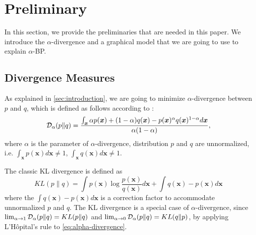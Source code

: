 \documentclass[conference]{IEEEtran}
\begin{document}





\section{Preliminary}\label{sec:preliminary}
In this section, we provide the preliminaries that are needed in this paper. We introduce the $\alpha$-divergence and a graphical model that we are going to use to explain $\alpha$-BP.

\subsection{Divergence Measures}
As explained in \autoref{sec:introduction}, we are going to minimize $\alpha$-divergence between $p$ and $q$, which is defined as follows according to \cite{Zhu95informationgeometric}\cite{divergence-measures-and-message-passing}: \\
\begin{equation}\label{eq:alpha-divergence}
  \mathcal{D}_{\alpha}(p \| q ) = \frac{\int_{\bm{x}} \alpha p(\bm{x}) + (1-\alpha) q (\bm{x}) - p(\bm{x})^{\alpha} q(\bm{x})^{1-\alpha} d\bm{x}}{\alpha(1-\alpha)},
\end{equation}
where $\alpha$ is the parameter of $\alpha$-divergence, distribution $p$ and $q$ are unnormalized, i.e. $\int_{\bm{x}}p(\bm{x}) d\bm{x} \neq 1$, $\int_{\bm{x}}q(\bm{x}) d\bm{x} \neq 1$.

The classic KL divergence is defined as
\begin{equation}
  KL(p \| q) = \int p(\bm{x}) \log{\frac{p(\bm{x})}{q(\bm{x})}} d \bm{x}+ \int q(\bm{x}) - p(\bm{x}) d\bm{x}
\end{equation}
where the $\int q(\bm{x}) - p(\bm{x}) d\bm{x}$ is a correction factor to accommodate unnormalized $p$ and $q$. The KL divergence is a special case of $\alpha$-divergence, since $\lim_{\alpha \rightarrow 1}\mathcal{D}_{\alpha}(p \| q ) = KL(p\|q)$ and $\lim_{\alpha \rightarrow 0}\mathcal{D}_{\alpha}(p \| q ) = KL(q\|p)$, by applying L'H\^opital's rule to \autoref{eq:alpha-divergence}.
\end{document}
